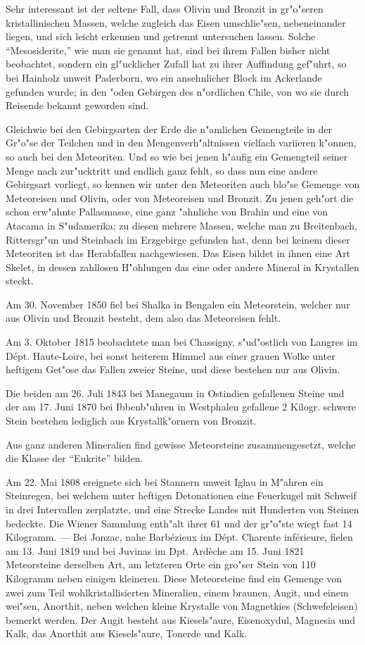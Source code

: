 \documentclass[a4paper, 11pt, oneside]{article}
\begin{document}
Sehr interessant ist der seltene Fall, dass Olivin und Bronzit in gr"o"seren kristallinischen Massen, welche zugleich das Eisen umschlie"sen, nebeneinander liegen, und sich leicht erkennen und getrennt untersuchen lassen. Solche "`Mesosiderite,"' wie man sie genannt hat, sind bei ihrem Fallen bisher nicht beobachtet, sondern ein gl"ucklicher Zufall hat zu ihrer Auffindung gef"uhrt, so bei Hainholz unweit Paderborn, wo ein ansehnlicher Block im Ackerlande gefunden wurde; in den "oden Gebirgen des n"ordlichen Chile, von wo sie durch Reisende bekannt geworden sind.

Gleichwie bei den Gebirgsarten der Erde die n"amlichen Gemengteile in der Gr"o"se der Teilchen und in den Mengenverh"altnissen vielfach variieren k"onnen, so auch bei den Meteoriten. Und so wie bei jenen h"aufig ein Gemengteil seiner Menge nach zur"ucktritt und endlich ganz fehlt, so dass nun eine andere Gebirgsart vorliegt, so kennen wir unter den Meteoriten auch blo"se Gemenge von Meteoreisen und Olivin, oder von Meteoreisen und Bronzit. Zu jenen geh"ort die schon erw"ahnte Pallasmasse, eine ganz "ahnliche von Brahin und eine von Atacama in S"udamerika; zu diesen mehrere Massen, welche man zu Breitenbach, Rittersgr"un und Steinbach im Erzgebirge gefunden hat, denn bei keinem dieser Meteoriten ist das Herabfallen nachgewiesen. Das Eisen bildet in ihnen eine Art Skelet, in dessen zahllosen H"ohlungen das eine oder andere Mineral in Krystallen steckt.

Am 30. November 1850 fiel bei Shalka in Bengalen ein Meteorstein, welcher nur aus Olivin und Bronzit besteht, dem also das Meteoreisen fehlt.

Am 3. Oktober 1815 beobachtete man bei Chassigny, s"ud"ostlich von Langres im Dépt. Haute-Loire, bei sonst heiterem Himmel aus einer grauen Wolke unter heftigem Get"ose das Fallen zweier Steine, und diese bestehen nur aus Olivin.

Die beiden am 26. Juli 1843 bei Manegaum in Ostindien gefallenen Steine und der am 17. Juni 1870 bei Ibbenb"uhren in Westphalen gefallene 2 Kilogr. schwere Stein bestehen lediglich aus Krystallk"ornern von Bronzit.

Aus ganz anderen Mineralien find gewisse Meteorsteine zusammengesetzt, welche die Klasse der "`Eukrite"' bilden.

Am 22. Mai 1808 ereignete sich bei Stannern unweit Iglau in M"ahren ein Steinregen, bei welchem unter heftigen Detonationen eine Feuerkugel mit Schweif in drei Intervallen zerplatzte, und eine Strecke Landes mit Hunderten von Steinen bedeckte. Die Wiener Sammlung enth"alt ihrer 61 und der gr"o"ste wiegt fast 14 Kilogramm. --- Bei Jonzac, nahe Barbézieux im Dépt. Charente inférieure, fielen am 13. Juni 1819 und bei Juvinas im Dpt. Ardèche am 15. Juni 1821 Meteorsteine derselben Art, am letzteren Orte ein gro"ser Stein von 110 Kilogramm neben einigen kleineren. Diese Meteorsteine find ein Gemenge von zwei zum Teil wohlkristallisierten Mineralien, einem braunen, Augit, und einem wei"sen, Anorthit, neben welchen kleine Krystalle von Magnetkies (Schwefeleisen) bemerkt werden. Der Augit besteht aus Kiesels"aure, Eisenoxydul, Magnesia und Kalk, das Anorthit aus Kiesels"aure, Tonerde und Kalk.
\end{document}
